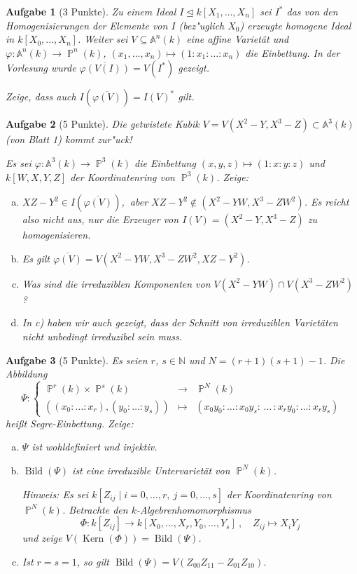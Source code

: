 \documentclass[a4paper, 12pt, numbers=noendperiod, chapterprefix=true]{scrbook}
\theoremstyle{break}
\newtheorem{Aufg}{Aufgabe}
\theoremstyle{nonumberbreak}
\theoremstyle{nonumberplain}
\DeclareMathOperator{\Kern}{Kern}
\DeclareMathOperator{\Bild}{Bild}
\DeclareMathOperator{\ideal}{\unlhd}
\newcommand{\N}{\mathbb{N}}
\newcommand{\A}{\mathbb{A}}
\newcommand{\Affine}{\mathbb{A}} %
\DeclareMathOperator{\Projective}{\mathbb{P}} %
\begin{document}
\begin{Aufg}[3 Punkte]
Zu einem Ideal $I\ideal k[X_1,\dots,X_n]$ sei $I^*$ das von den Homogenisierungen der Elemente von $I$ (bez"uglich $X_0$) erzeugte homogene Ideal in $k[X_0,\dots,X_n]$. Weiter sei $V\subseteq \Affine^n(k)$ eine affine Variet\"at und $\varphi: \Affine^n(k)\to \Projective^n(k)$, $(x_1,\dots,x_n)\mapsto (1:x_1:\ldots:x_n)$ die Einbettung. In der Vorlesung wurde $\overline{\varphi(V(I))} = V(I^*)$ gezeigt.

Zeige, dass auch $I(\overline{\varphi(V)}) = I(V)^*$ gilt.
\end{Aufg}

\begin{Aufg}[5 Punkte]
Die getwistete Kubik $V = V(X^2-Y, X^3-Z) \subset \Affine^3(k)$ (von Blatt 1) kommt zur"uck! 

Es sei $\varphi: \Affine^3(k)\to \Projective^3(k)$ die Einbettung $(x,y,z)\mapsto (1:x:y:z)$ und $k[W,X,Y,Z]$ der Koordinatenring von $\Projective^3(k)$. Zeige:
\begin{enumerate}[a)]
	\item $XZ-Y^2 \in I(\overline{\varphi(V)})$,$\ $ aber $XZ-Y^2\not\in (X^2-YW, X^3-ZW^2)$. Es reicht also nicht aus, nur die Erzeuger von $I(V) = (X^2-Y, X^3-Z)$ zu homogenisieren.
	\item Es gilt $\overline{\varphi(V)} = V(X^2 - YW, X^3-ZW^2, XZ-Y^2)$.
	\item Was sind die irreduziblen Komponenten von $V(X^2 -YW) \cap V(X^3-ZW^2)$?
	\item In c) haben wir auch gezeigt, dass der Schnitt von irreduziblen Variet\"aten nicht unbedingt irreduzibel sein muss.
\end{enumerate}\end{Aufg}

\begin{Aufg}[5 Punkte]
Es seien $r$, $s\in \N$ und $N= (r+1)(s+1) - 1$. Die Abbildung
	\[\Psi: \left\{ \begin{array}{ccc} \Projective^r(k)\times \Projective^s(k) &\to& \Projective^N(k)\\
		((x_0:\ldots:x_r),(y_0:\ldots:y_s)) &\mapsto& (x_0y_0:\ldots:x_0y_s:\, \ldots\, : x_ry_0: \ldots :x_ry_s ) 
		\end{array}
	\right.\]
hei\ss t \textit{Segre-Einbettung}. Zeige:
\begin{enumerate}[a)]
	\item $\Psi$ ist wohldefiniert und injektiv.
	\item $\Bild(\Psi)$ ist eine irreduzible Untervariet\"at von $\Projective^N(k)$.
 
	\emph{Hinweis: Es sei $k[Z_{ij}\mid i=0,\dots,r,\ j=0,\dots,s]$ der Koordinatenring von $\Projective^N(k)$. Betrachte den $k$-Algebrenhomomorphismus
		\[\Phi:k[Z_{ij}]\to k[X_0,\dots,X_r,Y_0,\dots,Y_s]\ ,\quad Z_{ij}\mapsto X_iY_j\]
	und zeige $V(\Kern(\Phi)) = \Bild(\Psi)$.}
	\item Ist $r=s=1$, so gilt $\Bild(\Psi) = V(Z_{00}Z_{11}-Z_{01}Z_{10})$.
\end{enumerate}\end{Aufg}
\end{document}
